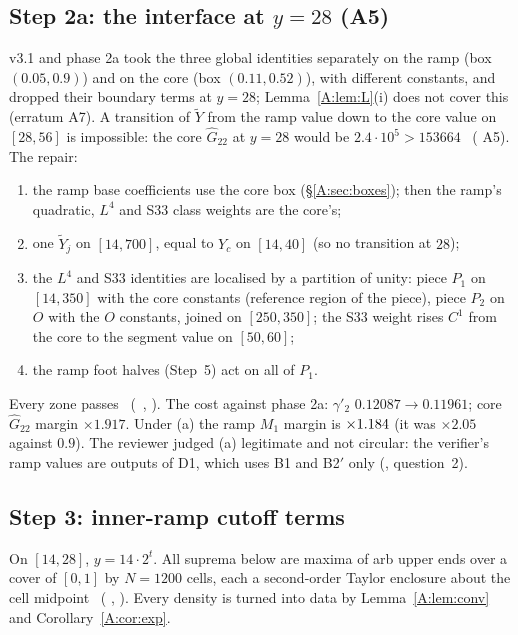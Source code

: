 \documentclass[11pt]{article}
\begin{document}
\subsection{Step 2a: the interface at $y=28$ (A5)}\label{A:sec:interface}
v3.1 and phase 2a took the three global identities separately on the ramp (box $(0.05,0.9)$) and on the core (box $(0.11,0.52)$), with different constants, and dropped their boundary terms at $y=28$; Lemma~\ref{A:lem:L}(i) does not cover this (erratum A7). A transition of $\tilde Y$ from the ramp value down to the core value on $[28,56]$ is impossible: the core $\hat G_{22}$ at $y=28$ would be $2.4\cdot10^5>153664$ \tC\ ( A5). The repair:
\begin{enumerate}[label=(\alph*),leftmargin=2em]
\item the ramp base coefficients use the core box (\S\ref{A:sec:boxes}); then the ramp's quadratic, $L^4$ and S33 class weights are the core's;
\item one $\tilde Y_j$ on $[14,700]$, equal to $Y_c$ on $[14,40]$ (so no transition at $28$);
\item the $L^4$ and S33 identities are localised by a partition of unity: piece $P_1$ on $[14,350]$ with the core constants (reference region of the piece), piece $P_2$ on $O$ with the $O$ constants, joined on $[250,350]$; the S33 weight rises $C^1$ from the core to the segment value on $[50,60]$;
\item the ramp foot halves (Step~5) act on all of $P_1$.
\end{enumerate}
Every zone passes \tC\ (\SA\ , ). The cost against phase 2a: $\gamma'_2$ $0.12087\to0.11961$; core $\hat G_{22}$ margin $\times1.917$. Under (a) the ramp $M_1$ margin is $\times1.184$ (it was $\times2.05$ against $0.9$). The reviewer judged (a) legitimate and not circular: the verifier's ramp values are outputs of D1, which uses B1 and B2$'$ only (, question~2).

\subsection{Step 3: inner-ramp cutoff terms}\label{A:sec:ramp}
On $[14,28]$, $y=14\cdot2^t$. All suprema below are maxima of arb upper ends over a cover of $[0,1]$ by $N=1200$ cells, each a second-order Taylor enclosure about the cell midpoint \tC\ ( , ). Every density is turned into data by Lemma~\ref{A:lem:conv} and Corollary~\ref{A:cor:exp}.
\end{document}

